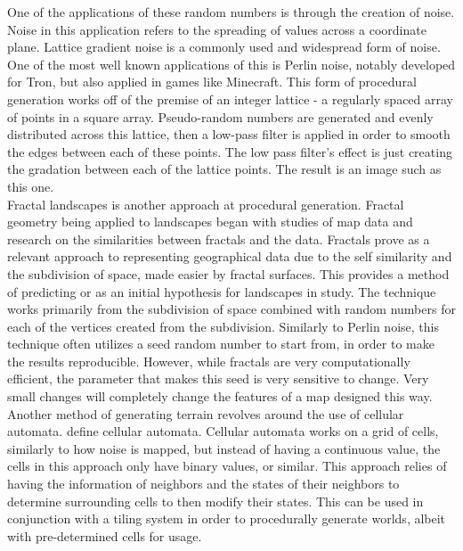 \documentclass[12pt]{report}
\begin{document}
		One of the applications of these random numbers is through the creation of noise. Noise in this application refers to the spreading of values across a coordinate plane. Lattice gradient noise is a commonly used and widespread form of noise. One of the most well known applications of this is Perlin noise, notably developed for Tron, but also applied in games like Minecraft. This form of procedural generation works off of the premise of an integer lattice - a regularly spaced array of points in a square array. Pseudo-random numbers are generated and evenly distributed across this lattice, then a low-pass filter is applied in order to smooth the edges between each of these points. The low pass filter's effect is just creating the gradation between each of the lattice points. The result is an image such as this one. \\

		Fractal landscapes is another approach at procedural generation. Fractal geometry being applied to landscapes began with studies of map data and research on the similarities between fractals and the data. Fractals prove as a relevant approach to representing geographical data due to the self similarity and the subdivision of space, made easier by fractal surfaces. This provides a method of predicting or as an initial hypothesis for landscapes in study. The technique works primarily from the subdivision of space combined with random numbers for each of the vertices created from the subdivision. Similarly to Perlin noise, this technique often utilizes a seed random number to start from, in order to make the results reproducible. However, while fractals are very computationally efficient, the parameter that makes this seed is very sensitive to change. Very small changes will completely change the features of a map designed this way. \\
		Another method of generating terrain revolves around the use of cellular automata. define cellular automata. Cellular automata works on a grid of cells, similarly to how noise is mapped, but instead of having a continuous value, the cells in this approach only have binary values, or similar. This approach relies of having the information of neighbors and the states of their neighbors to determine surrounding cells to then modify their states. This can be used in conjunction with a tiling system in order to procedurally generate worlds, albeit with pre-determined cells for usage.
		\\
		
\end{document}
